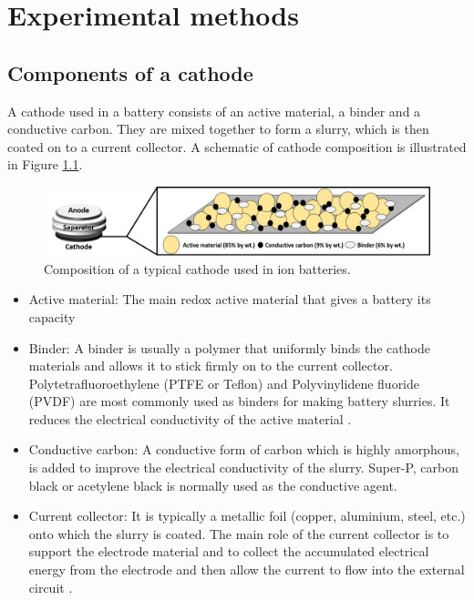 \chapter{Experimental methods} %
\label{chap3} %
\section{Components of a cathode}
A cathode used in a battery consists of an active material, a binder and a conductive carbon. They are mixed together to form a slurry, which is then coated on to a current collector. A schematic of cathode composition is illustrated in Figure \ref{Figures/chap3fig:cathodecomp}. 
\begin{figure}[tbh!]
\centering
\includegraphics[width=\textwidth]{Figures/chap3fig/cathodecomp}
\caption{Composition of a typical cathode used in ion batteries.}
\label{Figures/chap3fig:cathodecomp}
\end{figure}

\begin{itemize}
    \item Active material: The main redox active material that gives a battery its capacity
    \item Binder: A binder is usually a polymer that uniformly binds the cathode materials and allows it to stick firmly on to the current collector. Polytetrafluoroethylene (PTFE or Teflon) and Polyvinylidene fluoride (PVDF) are most commonly used as binders for making battery slurries. It reduces the electrical conductivity of the active  material \cite{grillet_conductivity_2016}. 
    \item Conductive carbon: A conductive form of carbon which is highly amorphous, is added to improve the electrical conductivity of the slurry. Super-P, carbon black or acetylene black is normally used as the conductive agent. 
    \item Current collector: It is typically a metallic foil (copper, aluminium, steel, etc.) onto which the slurry is coated. The main role of the current collector is to support the electrode material and to collect the accumulated electrical energy from the electrode and then allow the current to flow into the external circuit \cite{sun_effect_2017}.
\end{itemize}

